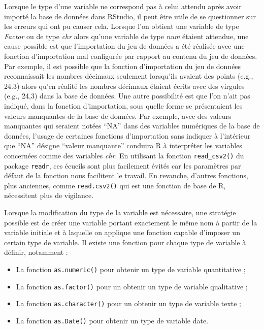 \documentclass[
  french,
]{book}
\providecommand{\tightlist}{%
  \setlength{\itemsep}{0pt}\setlength{\parskip}{0pt}}
\begin{document}
Lorsque le type d'une variable ne correspond pas à celui attendu après avoir importé la base de données dans RStudio, il peut être utile de se questionner sur les erreurs qui ont pu causer cela. Lorsque l'on obtient une variable de type \emph{Factor} ou de type \emph{chr} alors qu'une variable de type \emph{num} étaient attendue, une cause possible est que l'importation du jeu de données a été réalisée avec une fonction d'importation mal configurée par rapport au contenu du jeu de données. Par exemple, il est possible que la fonction d'importation du jeu de données reconnaissait les nombres décimaux seulement lorsqu'ils avaient des points (e.g., 24.3) alors qu'en réalité les nombres décimaux étaient écrits avec des virgules (e.g., 24,3) dans la base de données. Une autre possibilité est que l'on n'ait pas indiqué, dans la fonction d'importation, sous quelle forme se présentaient les valeurs manquantes de la base de données. Par exemple, avec des valeurs manquantes qui seraient notées ``NA'' dans des variables numériques de la base de données, l'usage de certaines fonctions d'importation sans indiquer à l'intérieur que ``NA'' désigne ``valeur manquante'' conduira R à interpréter les variables concernées comme des variables \emph{chr}. En utilisant la fonction \texttt{read\_csv2()} du package \texttt{readr}, ces écueils sont plus facilement évités car les paramètres par défaut de la fonction nous facilitent le travail. En revanche, d'autres fonctions, plus anciennes, comme \texttt{read.csv2()} qui est une fonction de base de R, nécessitent plus de vigilance.

Lorsque la modification du type de la variable est nécessaire, une stratégie possible est de créer une variable portant exactement le même nom à partir de la variable initiale et à laquelle on applique une fonction capable d'imposer un certain type de variable. Il existe une fonction pour chaque type de variable à définir, notamment :

\begin{itemize}
\tightlist
\item
  La fonction \texttt{as.numeric()} pour obtenir un type de variable quantitative ;
\item
  La fonction \texttt{as.factor()} pour un obtenir un type de variable qualitative ;
\item
  La fonction \texttt{as.character()} pour un obtenir un type de variable texte ;
\item
  La fonction \texttt{as.Date()} pour obtenir un type de variable date.
\end{itemize}
\end{document}
